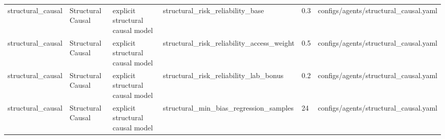 \begin{tabular}{llllll}
structural\_causal & Structural Causal & explicit structural causal model & structural\_risk\_reliability\_base & 0.3 & configs/agents/structural\_causal.yaml \\
structural\_causal & Structural Causal & explicit structural causal model & structural\_risk\_reliability\_access\_weight & 0.5 & configs/agents/structural\_causal.yaml \\
structural\_causal & Structural Causal & explicit structural causal model & structural\_risk\_reliability\_lab\_bonus & 0.2 & configs/agents/structural\_causal.yaml \\
structural\_causal & Structural Causal & explicit structural causal model & structural\_min\_bias\_regression\_samples & 24 & configs/agents/structural\_causal.yaml \\
\bottomrule
\end{tabular}
